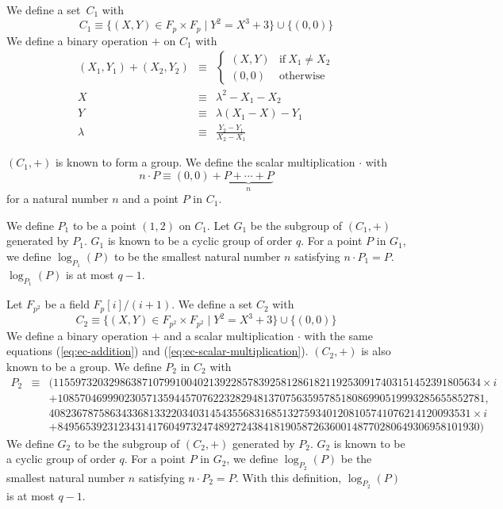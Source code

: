 \documentclass[9pt,oneside]{amsart}
\begin{document}
We define a set~$C_1$ with
\begin{equation}
C_1\equiv\{(X,Y)\in F_p\times F_p\mid Y^2=X^3+3\}\cup\{(0,0)\}
\end{equation}
We define a binary operation $+$ on $C_1$ with
\begin{eqnarray}\label{eq:ec-addition}
(X_1, Y_1) + (X_2, Y_2)&\equiv&\begin{cases}
(X,Y)&\text{if}\ X_1\neq X_2\\
(0,0)&\text{otherwise}
\end{cases}\\
X&\equiv&\lambda^2-X_1-X_2\\
Y&\equiv&\lambda(X_1-X)-Y_1\\
\lambda&\equiv&\frac{Y_2-Y_1}{X_2-X_1}
\end{eqnarray}

$(C_1,+)$ is known to form a group. We define the scalar multiplication $\cdot$ with
\begin{equation}\label{eq:ec-scalar-multiplication}
n\cdot P\equiv(0,0)+\underbrace{P+\cdots+P}_{n}
\end{equation}
for a natural number $n$ and a point $P$ in $C_1$.

We define $P_1$ to be a point $(1,2)$ on $C_1$. Let $G_1$ be the subgroup of $(C_1,+)$ generated by $P_1$. $G_1$ is known to be a cyclic group of order $q$. For a point $P$ in $G_1$, we define $\log_{P_1}(P)$ to be the smallest natural number $n$ satisfying $n\cdot P_1=P$. $\log_{P_1}(P)$ is at most $q-1$.

Let $F_{p^2}$ be a field $F_p[i]/(i+1)$. We define a set $C_2$ with
\begin{equation}
C_2\equiv\{(X,Y)\in F_{p^2}\times F_{p^2}\mid Y^2=X^3+3\}\cup\{(0,0)\}
\end{equation}
We define a binary operation $+$ and a scalar multiplication $\cdot$ with the same equations (\ref{eq:ec-addition}) and (\ref{eq:ec-scalar-multiplication}). $(C_2,+)$ is also known to be a group. We define $P_2$ in $C_2$ with
\begin{eqnarray}
P_2&\equiv&
(11559732032986387107991004021392285783925812861821192530917403151452391805634 \times i\\\nonumber &&+ 10857046999023057135944570762232829481370756359578518086990519993285655852781,\\\nonumber && 4082367875863433681332203403145435568316851327593401208105741076214120093531 \times i\\\nonumber &&+ 8495653923123431417604973247489272438418190587263600148770280649306958101930)
\end{eqnarray}
We define $G_2$ to be the subgroup of $(C_2,+)$ generated by $P_2$. $G_2$ is known to be a cyclic group of order $q$. For a point $P$ in $G_2$, we define $\log_{P_2}(P)$ be the smallest natural number $n$ satisfying $n\cdot P_2=P$. With this definition, $\log_{P_2}(P)$ is at most $q-1$.
\end{document}
